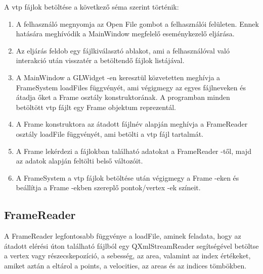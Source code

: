 A vtp fájlok betöltése a következő séma szerint történik:
\begin{enumerate}
\item
A felhasználó megnyomja az Open File gombot a felhasználói felületen. 
Ennek hatására meghívódik a {\ttfamily MainWindow} megfelelő eseménykezelő eljárása.
\item
Az eljárás feldob egy fájlkiválasztó ablakot, 
ami a felhasználóval való interakció után visszatér a betöltendő fájlok listájával.
\item
A {\ttfamily MainWindow} a {\ttfamily GLWidget} -en keresztül közvetetten 
meghívja a {\ttfamily FrameSystem} {\ttfamily loadFiles} függvényét, 
ami végigmegy az egyes fájlneveken és átadja őket 
a {\ttfamily Frame} osztály konstruktorának. 
A programban minden betöltött vtp fájlt egy {\ttfamily Frame} objektum reprezentál.
\item
A {\ttfamily Frame} konstruktora az átadott fájlnév alapján meghívja 
a {\ttfamily FrameReader} osztály {\ttfamily loadFile} függvényét, 
ami betölti a vtp fájl tartalmát.
\item
A {\ttfamily Frame} lekérdezi 
a fájlokban található adatokat a {\ttfamily FrameReader} -től, 
majd az adatok alapján feltölti belső változóit.
\item
A {\ttfamily FrameSystem} a vtp fájlok betöltése után végigmegy 
a {\ttfamily Frame} -eken 
és beállítja a {\ttfamily Frame} -ekben szereplő pontok/vertex -ek színeit.
\end{enumerate}

\subsection{FrameReader}

A {\ttfamily FrameReader} legfontosabb függvénye a {\ttfamily loadFile}, 
aminek feladata, 
hogy az átadott elérési úton található fájlból 
egy {\ttfamily QXmlStreamReader} segítségével betöltse a vertex vagy részecskepozíció, 
a sebesség, az area, valamint az index értékeket, 
amiket aztán a eltárol a {\ttfamily points}, 
a {\ttfamily velocities}, 
az {\ttfamily areas} és az {\ttfamily indices} tömbökben.

